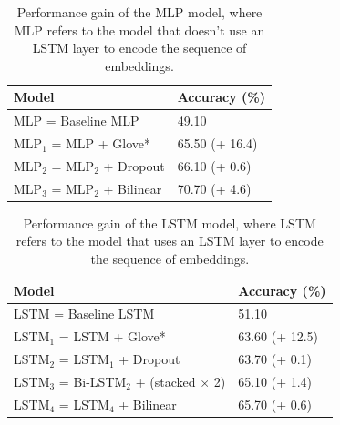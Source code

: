 \documentclass[11pt,a4paper]{article}
\begin{document}
	\begin{table}[H]
		\centering
		\begin{tabular}{@{}ll@{}}
			\toprule
			\textbf{Model}               & \textbf{Accuracy (\%)} \\ \midrule
			MLP = Baseline MLP           & 49.10              \\
			MLP$_1$ = MLP + Glove*       & 65.50 (+ 16.4)     \\
			MLP$_2$ = MLP$_2$ + Dropout  & 66.10 (+ 0.6)      \\
			MLP$_3$ = MLP$_2$ + Bilinear & 70.70 (+ 4.6)     \\ \bottomrule
		\end{tabular}
		\caption{Performance gain of the MLP model, where MLP refers to the model that doesn't use an LSTM layer to encode the sequence of embeddings.}
		\label{tab:MLP-model}
	\end{table}
	
	\begin{table}[H]
		\centering
		\begin{tabular}{@{}ll@{}}
			\toprule
			\textbf{Model}                                        & \textbf{Accuracy (\%)} \\ \midrule
			LSTM = Baseline LSTM                                  & 51.10                  \\
			LSTM$_1$ = LSTM + Glove*                              & 63.60 (+ 12.5)         \\
			LSTM$_2$ = LSTM$_1$ + Dropout                         & 63.70 (+ 0.1)          \\
			LSTM$_3$ = Bi-LSTM$_2$ + (stacked $\times$ 2) & 65.10 (+ 1.4)          \\
			LSTM$_4$ = LSTM$_4$ + Bilinear                        & 65.70 (+ 0.6)       \\ \bottomrule  
		\end{tabular}
		\caption{Performance gain of the LSTM model, where LSTM refers to the model that uses an LSTM layer to encode the sequence of embeddings.}
		\label{tab:my-table}
	\end{table}
\end{document}

